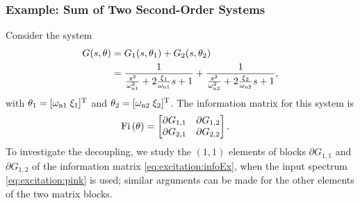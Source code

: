 \subsubsection{Example: Sum of Two Second-Order Systems}
\label{sec:excitation:ex:sumOfSecondOrderSipmle}
Consider the system
\begin{align}
G(s,\theta) &= G_1(s,\theta_1) + G_2(s,\theta_2)\\
&=\frac{1}{\frac{s^2}{\wn[1]^2} + 2\frac{\damping[1]}{\wn[1]}s + 1} 
   + \frac{1}{\frac{s^2}{\wn[2]^2} + 2\frac{\damping[2]}{\wn[2]}s + 1},
\end{align}
with $\theta_1=[\wn[1]\;\damping[1]]^{\T}$ and $\theta_2=[\wn[2]\;\damping[2]]^{\T}$.
The information matrix for this system is
\begin{align}
\Fi{\theta} &=
       \begin{bmatrix}
         \partial G_{1,1}  & \partial G_{1,2}\\
         \partial G_{2,1}  & \partial G_{2,2}
       \end{bmatrix}
       \text{.}
\label{eq:excitation:infoEx}
\end{align}
To investigate the decoupling, we study the $(1,1)$ elements of blocks $\partial G_{1,1}$ and $\partial G_{1,2}$ of the information matrix \eqref{eq:excitation:infoEx}, when the input spectrum \eqref{eq:excitation:pink} is used; similar arguments can be made for the other elements of the two matrix blocks.

